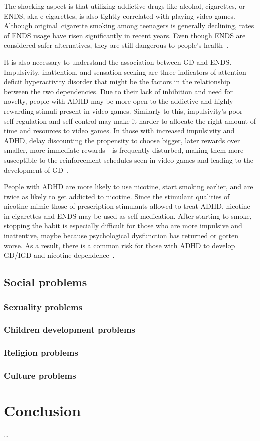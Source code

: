 \documentclass[10pt,twoside,english,a4paper]{article}
\begin{document}
The shocking aspect is that utilizing addictive drugs like alcohol, cigarettes, or ENDS, aka e-cigarettes, is also tightly correlated with playing video games. Although original cigarette smoking among teenagers is generally declining, rates of ENDS usage have risen significantly in recent years. Even though ENDS are considered safer alternatives, they are still dangerous to people's health~\cite{disorder}.

It is also necessary to understand the association between GD and ENDS. Impulsivity, inattention, and sensation-seeking are three indicators of attention-deficit hyperactivity disorder that might be the factors in the relationship between the two dependencies. Due to their lack of inhibition and need for novelty, people with ADHD may be more open to the addictive and highly rewarding stimuli present in video games. Similarly to this, impulsivity's poor self-regulation and self-control may make it harder to allocate the right amount of time and resources to video games. In those with increased impulsivity and ADHD, delay discounting the propensity to choose bigger, later rewards over smaller, more immediate rewards—is frequently disturbed, making them more susceptible to the reinforcement schedules seen in video games and leading to the development of GD~\cite{disorder}.

People with ADHD are more likely to use nicotine, start smoking earlier, and are twice as likely to get addicted to nicotine. Since the stimulant qualities of nicotine mimic those of prescription stimulants allowed to treat ADHD, nicotine in cigarettes and ENDS may be used as self-medication. After starting to smoke, stopping the habit is especially difficult for those who are more impulsive and inattentive, maybe because psychological dysfunction has returned or gotten worse. As a result, there is a common risk for those with ADHD to develop GD/IGD and nicotine dependence~\cite{disorder}.

\subsection{Social problems}
\subsubsection{Sexuality problems}
\subsubsection{Children development problems}
\subsubsection{Religion problems}
\subsubsection{Culture problems}


\section{Conclusion} \label{conclusion}
\ldots




\end{document}
